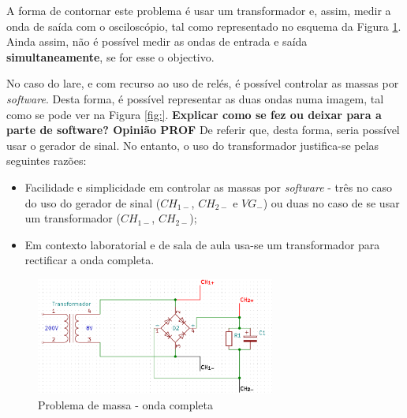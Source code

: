 A forma de contornar este problema é usar um transformador e, assim, medir a onda de saída com o osciloscópio, tal como representado no esquema da Figura \ref{fig:ondacompleta-massa}. Ainda assim, não é possível medir as ondas de entrada e saída \textbf{simultaneamente}, se for esse o objectivo.

No caso do \acrshort{lare}, e com recurso ao uso de relés, é possível controlar as massas por \textit{software}. Desta forma, é possível representar as duas ondas numa imagem, tal como se pode ver na Figura \ref{fig:}. \textbf{Explicar como se fez ou deixar para a parte de software? Opinião PROF}
De referir que, desta forma, seria possível usar o gerador de sinal. No entanto, o uso do transformador justifica-se pelas seguintes razões:
\begin{itemize}
	\item Facilidade e simplicidade em controlar as massas por \textit{software} - três no caso do uso do gerador de sinal ($CH_{1-}$, $CH_{2-}$ e $VG_{-}$) ou duas no caso de se usar um transformador ($CH_{1-}$, $CH_{2-}$);
	\item Em contexto laboratorial e de sala de aula usa-se um transformador para rectificar a onda completa.
\end{itemize}


\begin{figure}[hbtp]
	\centering
	\includegraphics[width=0.7\textwidth]{figures/sch-ondacompleta-massa.png}
	\caption{Problema de massa - onda completa}
	\label{fig:ondacompleta-massa}
\end{figure}

